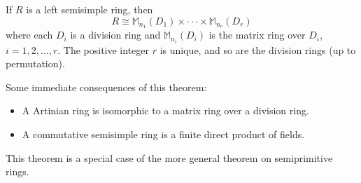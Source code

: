 \documentclass[12pt]{article}
\begin{document}
If $R$ is a left semisimple ring, then
$$R \cong \mathbb{M}_{n_1}(D_1) \times \cdot\cdot\cdot \times \mathbb{M}_{n_r}(D_r)$$
where each $D_i$ is a division ring and $\mathbb{M}_{n_i}(D_i)$ is the matrix ring over $D_i$, $i = 1, 2, \ldots, r$.  The positive integer $r$ is unique, and so are the division rings (up to permutation).

Some immediate consequences of this theorem:
\begin{itemize}
\item
A  Artinian ring is isomorphic to a matrix ring over a division ring.
\item
A commutative semisimple ring is a finite direct product of fields.
\end{itemize}

This theorem is a special case of the more general  theorem on semiprimitive rings.
\end{document}
